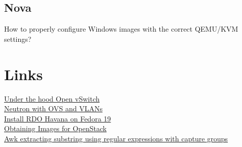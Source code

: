 \documentclass[11pt,letterpaper,oneside]{book}
\begin{document}
\section{Nova}
How to properly configure Windows images with the correct QEMU/KVM settings?
\chapter{Links}
\href{http://docs.openstack.org/grizzly/openstack-network/admin/content//under_the_hood_openvswitch.html}{Under the hood Open vSwitch}\\
\href{http://openstack.redhat.com/Neutron\_with\_OVS\_and\_VLANs}{Neutron with OVS and VLANs}\\
\href{http://www.blog.sandro-mathys.ch/2013/08/install-rdo-havana-2-on-fedora-19-and.html}{Install RDO Havana on Fedora 19}\\
\href{http://docs.openstack.org/image-guide/content/ch\_obtaining\_images.html}{Obtaining Images for OpenStack}\\
\href{http://www.markhneedham.com/blog/2013/06/26/unixawk-extracting-substring-using-a-regular-expression-with-capture-groups/}{Awk extracting substring using regular expressions with capture groups}\\
\end{document}
